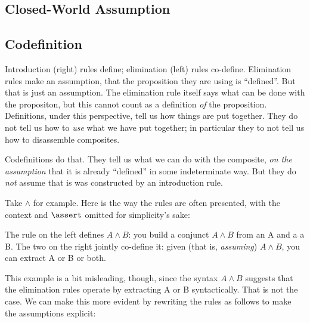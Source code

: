 \documentclass{article}
\begin{document}
\subsection{Closed-World Assumption}



\subsection{Codefinition}

Introduction (right) rules define; elimination (left) rules co-define.
Elimination rules make an assumption, that the proposition they are
using is ``defined''. But that is just an assumption. The elimination
rule itself says what can be done with the propositon, but this cannot
count as a definition \textit{of} the proposition. Definitions, under
this perspective, tell us how things are put together. They do not
tell us how to \textit{use} what we have put together; in particular
they to not tell us how to disassemble composites.

Codefinitions do that. They tell us what we can do with the composite,
\textit{on the assumption} that it is already ``defined'' in some
indeterminate way. But they do \textit{not} assume that is was
constructed by an introduction rule.

Take \(\land\) for example. Here is the way the rules are often
presented, with the context and \(\linfer\) omitted for simplicity's
sake:


The rule on the left defines \(A\land B\): you build a conjunct
\(A\land B\) from an A and a a B. The two on the right jointly
co-define it: given (that is, \textit{assuming}) \(A\land B\), you
can extract A or B or both.

This example is a bit misleading, though, since the syntax \(A\land
B\) suggests that the elimination rules operate by extracting A or B
syntactically. That is not the case. We can make this more evident by
rewriting the rules as follows to make the assumptions explicit:

\end{document}
